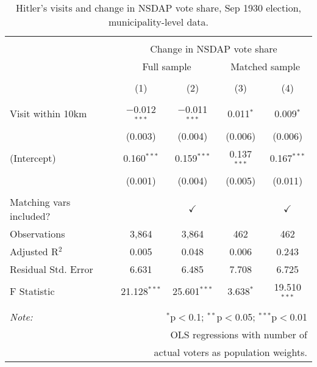 
\begin{table}[!htbp] \centering 
  \caption{Hitler's visits and change in NSDAP vote share, Sep 1930 election, municipality-level data.} 
  \label{tab:ols--5} 
\begin{tabular}{@{\extracolsep{5pt}}lcccc} 
\\[-1.8ex]\hline 
\hline \\[-1.8ex] 
 & \multicolumn{4}{c}{Change in NSDAP vote share} \\ 
\cline{2-5} 
 & \multicolumn{2}{c}{Full sample} & \multicolumn{2}{c}{Matched sample} \\ 
\\[-1.8ex] & (1) & (2) & (3) & (4)\\ 
\hline \\[-1.8ex] 
 Visit within 10km & $-$0.012$^{***}$ & $-$0.011$^{***}$ & 0.011$^{*}$ & 0.009$^{*}$ \\ 
  & (0.003) & (0.004) & (0.006) & (0.006) \\ 
  (Intercept) & 0.160$^{***}$ & 0.159$^{***}$ & 0.137$^{***}$ & 0.167$^{***}$ \\ 
  & (0.001) & (0.004) & (0.005) & (0.011) \\ 
 \hline \\[-1.8ex] 
Matching vars included? &  & \multicolumn{1}{c}{$\checkmark$} &  & \multicolumn{1}{c}{$\checkmark$} \\ 
Observations & 3,864 & 3,864 & 462 & 462 \\ 
Adjusted R$^{2}$ & 0.005 & 0.048 & 0.006 & 0.243 \\ 
Residual Std. Error & 6.631 & 6.485 & 7.708 & 6.725 \\ 
F Statistic & 21.128$^{***}$ & 25.601$^{***}$ & 3.638$^{*}$ & 19.510$^{***}$ \\ 
\hline 
\hline \\[-1.8ex] 
\textit{Note:}  & \multicolumn{4}{r}{$^{*}$p$<$0.1; $^{**}$p$<$0.05; $^{***}$p$<$0.01} \\ 
 & \multicolumn{4}{r}{OLS regressions with number of} \\ 
 & \multicolumn{4}{r}{actual voters as population weights.} \\ 
\end{tabular} 
\end{table} 
